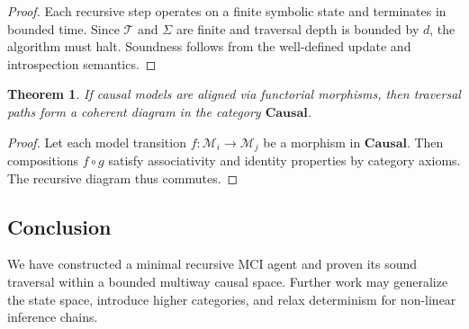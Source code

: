 \documentclass[10pt]{article}
\newtheorem{theorem}{Theorem}
\begin{document}
\begin{proof}

Each recursive step operates on a finite symbolic state and terminates in
bounded time. Since \( \mathcal{T} \) and \( \Sigma \) are finite and traversal
depth is bounded by \( d \), the algorithm must halt. Soundness follows from
the well-defined update and introspection semantics.

\end{proof}

\begin{theorem}

If causal models are aligned via functorial morphisms, then traversal paths
form a coherent diagram in the category \( \mathbf{Causal} \).

\end{theorem}

\begin{proof}

Let each model transition \( f: \mathcal{M}_i \rightarrow \mathcal{M}_j \) be a
morphism in \( \mathbf{Causal} \). Then compositions \( f \circ g \) satisfy
associativity and identity properties by category axioms. The recursive diagram
thus commutes.

\end{proof}

\subsection{Conclusion}

We have constructed a minimal recursive MCI agent and proven its sound
traversal within a bounded multiway causal space. Further work may generalize
the state space, introduce higher categories, and relax determinism for
non-linear inference chains.
\end{document}
